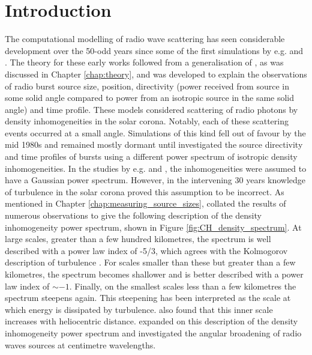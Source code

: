 \section{Introduction}
\label{sec:obsvtheory_intro}
The computational modelling of radio wave scattering has seen considerable development over the 50-odd years since some of the first simulations by e.g. \cite{Fokker1965} and \cite{Steinberg1971}. The theory for these early works followed from a generalisation of \cite{Chandrasekhar1952}, as was discussed in Chapter \ref{chap:theory}, and was developed to explain the observations of radio burst source size, position, directivity (power received from source in some solid angle compared to power from an isotropic source in the same solid angle) and time profile. These models considered scattering of radio photons by density inhomogeneities in the solar corona. Notably, each of these scattering events occurred at a small angle. Simulations of this kind fell out of favour by the mid 1980s and remained mostly dormant until \cite{Thejappa2007} investigated the source directivity and time profiles of bursts using a different power spectrum of isotropic density inhomogeneities. In the studies by e.g. \cite{Fokker1965} and \cite{Steinberg1971}, the inhomogeneities were assumed to have a Gaussian power spectrum. However, in the intervening 30 years knowledge of turbulence in the solar corona proved this assumption to be incorrect. As mentioned in Chapter \ref{chap:measuring_source_sizes}, \cite{Coles1989} collated the results of numerous observations to give the following description of the density inhomogeneity power spectrum, shown in Figure \ref{fig:CH_density_spectrum}. At large scales, greater than a few hundred kilometres, the spectrum is well described with a power law index of -5/3, which agrees with the Kolmogorov description of turbulence \citep{Kolmogorov1941}. For scales smaller than these but greater than a few kilometres, the spectrum becomes shallower and is better described with a power law index of $\sim -1$. Finally, on the smallest scales less than a few kilometres the spectrum steepens again. This steepening has been interpreted as the scale at which energy is dissipated by turbulence. \cite{Coles1989} also found that this inner scale increases with heliocentric distance. \cite{Bastian1994} expanded on this description of the density inhomogeneity power spectrum and investigated the angular broadening of radio waves sources at centimetre wavelengths.

